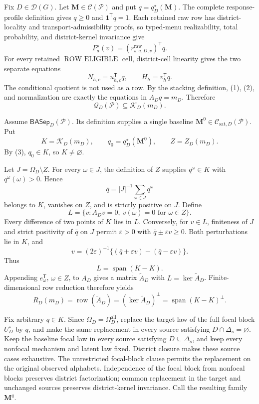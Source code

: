 Fix \(D\in\mathcal D(G)\).  Let \(\mathbf M\in\mathcal C(\mathcal P)\) and put \(q=q_D^\star(\mathbf M)\).  The complete response-profile definition gives \(q\geq0\) and \(\mathbf 1^{\mathsf T}q=1\).  Each retained raw row has district-locality and transport-admissibility proofs, so typed-menu realizability, total probability, and district-kernel invariance give
\[
P_a^s(v)=(r^{\mathrm{raw}}_{s,a,D,v})^{\mathsf T}q.
\tag{1}
\]
For every retained \(\operatorname{ROW\_ELIGIBLE}\) cell, district-cell linearity gives the two separate equations
\[
N_{h,c}=u_{h,c}^{\mathsf T}q,
\qquad
H_h=v_h^{\mathsf T}q.
\tag{2}
\]
The conditional quotient is not used as a row.  By the stacking definition, (1), (2), and normalization are exactly the equations in \(A_Dq=m_D\).  Therefore
\[
\mathcal Q_D(\mathcal P)\subseteq\mathcal K_D(m_D).
\tag{3}
\]

Assume \(\mathsf{BASep}_D(\mathcal P)\).  Its definition supplies a single baseline \(\mathbf M^0\in\mathcal C_{\mathrm{sat},D}(\mathcal P)\).  Put
\[
K=\mathcal K_D(m_D),
\qquad q_0=q_D^\star(\mathbf M^0),
\qquad Z=Z_D(m_D).
\]
By (3), \(q_0\in K\), so \(K\ne\varnothing\).

Let \(J=\Omega_D\setminus Z\).  For every \(\omega\in J\), the definition of \(Z\) supplies \(q^\omega\in K\) with \(q^\omega(\omega)>0\).  Hence
\[
\bar q=|J|^{-1}\sum_{\omega\in J}q^\omega
\]
belongs to \(K\), vanishes on \(Z\), and is strictly positive on \(J\).  Define
\[
L=\{v:A_Dv=0,\ v(\omega)=0\text{ for }\omega\in Z\}.
\]
Every difference of two points of \(K\) lies in \(L\).  Conversely, for \(v\in L\), finiteness of \(J\) and strict positivity of \(\bar q\) on \(J\) permit \(\varepsilon>0\) with \(\bar q\pm\varepsilon v\geq0\).  Both perturbations lie in \(K\), and
\[
v=(2\varepsilon)^{-1}\{(\bar q+\varepsilon v)-(\bar q-\varepsilon v)\}.
\]
Thus
\[
L=\operatorname{span}(K-K).
\tag{4}
\]
Appending \(e_\omega^{\mathsf T}\), \(\omega\in Z\), to \(A_D\) gives a matrix \(\widetilde A_D\) with \(L=\ker\widetilde A_D\).  Finite-dimensional row reduction therefore yields
\[
R_D(m_D)=\operatorname{row}(\widetilde A_D)
=(\ker\widetilde A_D)^\perp
=\operatorname{span}(K-K)^\perp.
\tag{5}
\]

Fix arbitrary \(q\in K\).  Since \(\Omega_D=\Omega_D^{\mathrm{all}}\), replace the target law of the full focal block \(U_D^\star\) by \(q\), and make the same replacement in every source satisfying \(D\cap\Delta_s=\varnothing\).  Keep the baseline focal law in every source satisfying \(D\subseteq\Delta_s\), and keep every nonfocal mechanism and latent law fixed.  District closure makes these source cases exhaustive.  The unrestricted focal-block clause permits the replacement on the original observed alphabets.  Independence of the focal block from nonfocal blocks preserves district factorization; common replacement in the target and unchanged sources preserves district-kernel invariance.  Call the resulting family \(\mathbf M^q\).

